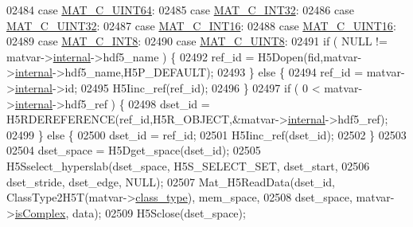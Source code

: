 \begin{DoxyCode}
{{{{{{{{{{02484         \textcolor{keywordflow}{case} \hyperlink{group___m_a_t_ggad4d60ae7b709fc81bfd744fb4c857c40a86470e25c3763d9a24623f04326195dd}{MAT\_C\_UINT64}:
02485         \textcolor{keywordflow}{case} \hyperlink{group___m_a_t_ggad4d60ae7b709fc81bfd744fb4c857c40adb44fc39694e3152ae5e69470a2fefe8}{MAT\_C\_INT32}:
02486         \textcolor{keywordflow}{case} \hyperlink{group___m_a_t_ggad4d60ae7b709fc81bfd744fb4c857c40a9a17a7edd45b19ef68197db81b27e816}{MAT\_C\_UINT32}:
02487         \textcolor{keywordflow}{case} \hyperlink{group___m_a_t_ggad4d60ae7b709fc81bfd744fb4c857c40a40370e9de516c5036a67a5865c071006}{MAT\_C\_INT16}:
02488         \textcolor{keywordflow}{case} \hyperlink{group___m_a_t_ggad4d60ae7b709fc81bfd744fb4c857c40a8bede21dbf6c1edc0bbccc1481bccae7}{MAT\_C\_UINT16}:
02489         \textcolor{keywordflow}{case} \hyperlink{group___m_a_t_ggad4d60ae7b709fc81bfd744fb4c857c40a984ff310f9e906100fcff95f704f43c5}{MAT\_C\_INT8}:
02490         \textcolor{keywordflow}{case} \hyperlink{group___m_a_t_ggad4d60ae7b709fc81bfd744fb4c857c40a81270f8093cb4808e992c1d29d84d4e3}{MAT\_C\_UINT8}:
02491             \textcolor{keywordflow}{if} ( NULL != matvar->\hyperlink{group___m_a_t_a6e97e3ed9f40c49322c18561c2a94e92}{internal}->hdf5\_name ) \{
02492                 ref\_id = H5Dopen(fid,matvar->\hyperlink{group___m_a_t_a6e97e3ed9f40c49322c18561c2a94e92}{internal}->hdf5\_name,H5P\_DEFAULT);
02493             \} \textcolor{keywordflow}{else} \{
02494                 ref\_id = matvar->\hyperlink{group___m_a_t_a6e97e3ed9f40c49322c18561c2a94e92}{internal}->id;
02495                 H5Iinc\_ref(ref\_id);
02496             \}
02497             \textcolor{keywordflow}{if} ( 0 < matvar->\hyperlink{group___m_a_t_a6e97e3ed9f40c49322c18561c2a94e92}{internal}->hdf5\_ref ) \{
02498                 dset\_id = H5RDEREFERENCE(ref\_id,H5R\_OBJECT,&matvar->\hyperlink{group___m_a_t_a6e97e3ed9f40c49322c18561c2a94e92}{internal}->hdf5\_ref);
02499             \} \textcolor{keywordflow}{else} \{
02500                 dset\_id = ref\_id;
02501                 H5Iinc\_ref(dset\_id);
02502             \}
02503 
02504             dset\_space = H5Dget\_space(dset\_id);
02505             H5Sselect\_hyperslab(dset\_space, H5S\_SELECT\_SET, dset\_start,
02506                                 dset\_stride, dset\_edge, NULL);
02507             Mat\_H5ReadData(dset\_id, ClassType2H5T(matvar->\hyperlink{group___m_a_t_aff13035bf3265dd7d9425e5d40c839d4}{class\_type}), mem\_space,
02508                 dset\_space, matvar->\hyperlink{group___m_a_t_aeb03b3a69f108dc05470b00443a43739}{isComplex}, data);
02509             H5Sclose(dset\_space);
}}}}}}}}}}
\end{DoxyCode}
